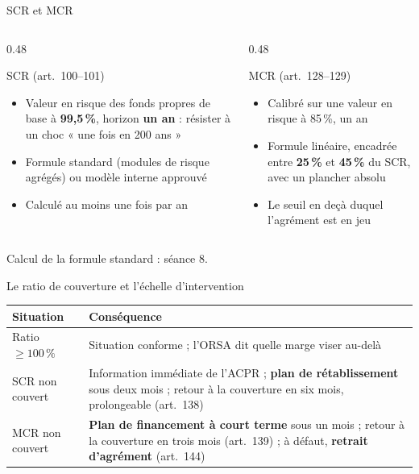 \documentclass[10pt,aspectratio=169]{beamer}
\begin{document}
\begin{frame}{SCR et MCR}
\begin{columns}[T]
\begin{column}{0.48\textwidth}
\begin{block}{SCR (art.~100--101)}
\begin{itemize}
  \item Valeur en risque des fonds propres de base à \textbf{99,5\,\%}, horizon \textbf{un an} :
        résister à un choc « une fois en 200 ans »
  \item Formule standard (modules de risque agrégés) ou modèle interne approuvé
  \item Calculé au moins une fois par an
\end{itemize}
\end{block}
\end{column}
\begin{column}{0.48\textwidth}
\begin{block}{MCR (art.~128--129)}
\begin{itemize}
  \item Calibré sur une valeur en risque à 85\,\%, un an
  \item Formule linéaire, encadrée entre \textbf{25\,\%} et \textbf{45\,\%} du SCR, avec un plancher absolu
  \item Le seuil en deçà duquel l'agrément est en jeu
\end{itemize}
\end{block}
\end{column}
\end{columns}
\vspace{0.2cm}
\begin{center}\small Calcul de la formule standard : séance 8.\end{center}
\end{frame}

\begin{frame}{Le ratio de couverture et l'échelle d'intervention}
\begin{center}
\end{center}
\begin{table}
\centering
\small
\renewcommand{\arraystretch}{1.4}
\begin{tabular}{p{4.2cm}p{8.3cm}}
\toprule
\textbf{Situation} & \textbf{Conséquence} \\
\midrule
Ratio $\geq 100\,\%$ & Situation conforme ; l'ORSA dit quelle marge viser au-delà \\
SCR non couvert & Information immédiate de l'ACPR ; \textbf{plan de rétablissement} sous deux mois ;
retour à la couverture en six mois, prolongeable (art.~138) \\
MCR non couvert & \textbf{Plan de financement à court terme} sous un mois ; retour à la couverture en
trois mois (art.~139) ; à défaut, \textbf{retrait d'agrément} (art.~144) \\
\bottomrule
\end{tabular}
\end{table}
\end{frame}
\end{document}
